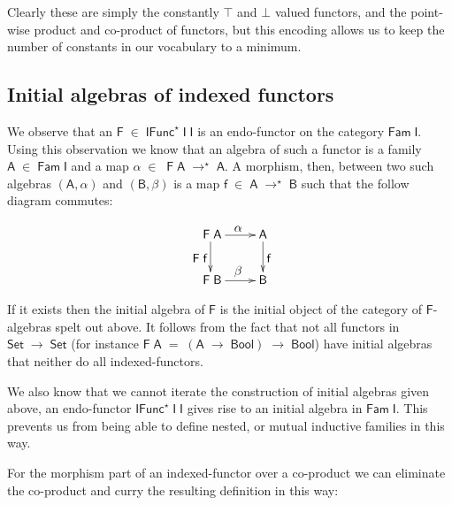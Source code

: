 \documentclass[a4paper]{article}
\newcommand{\Conid}[1]{\mathit{#1}}
\newcommand{\Varid}[1]{\mathit{#1}}
\renewcommand\Varid[1]{\mathord{\textsf{#1}}}
\let\Conid\Varid
\begin{document}
\noindent
Clearly these are simply the constantly \ensuremath{\top} and \ensuremath{\bot} valued functors, and the 
point-wise product and co-product of functors, but this encoding allows us to 
keep the number of constants in our vocabulary to a minimum.

\subsection{Initial algebras of indexed functors}

We observe that an \ensuremath{\Conid{F}\;\in\;\Conid{IFunc}^{\star}\;\Conid{I}\;\Conid{I}} is an endo-functor on the category \ensuremath{\Conid{Fam}\;\Conid{I}}. 
Using this observation we know that an algebra of such a functor is a family 
\ensuremath{\Conid{A}\;\in\;\Conid{Fam}\;\Conid{I}} and a map \ensuremath{\alpha\;\in\;\;\Conid{F}\;\Conid{A}\;\rightarrow^{\star}\;\Conid{A}}. A morphism, then, between two such 
algebras \ensuremath{(\Conid{A},\alpha)} and \ensuremath{(\Conid{B},\beta)} is a map \ensuremath{\Varid{f}\;\in\;\Conid{A}\;\rightarrow^{\star}\;\Conid{B}} such that the follow 
diagram commutes:

 \[
\xymatrix{
\mbox{\ensuremath{\;\Conid{F}\;\Conid{A}}}  \ar[r]^{\;\mbox{\ensuremath{\alpha}}} 
\ar[d]_{\mbox{\ensuremath{\;\Conid{F}\;\Varid{f}}}} & \mbox{\ensuremath{\Conid{A}}} \ar[d]^{\mbox{\ensuremath{\Varid{f}}}}\\
\mbox{\ensuremath{\;\Conid{F}\;\Conid{B}}} \ar[r]^{\;\mbox{\ensuremath{\beta}}} & \mbox{\ensuremath{\Conid{B}}}}
\]

\noindent
If it exists then the initial algebra of \ensuremath{\Conid{F}} is the initial object of the 
category of \ensuremath{\Conid{F}}-algebras spelt out above. It follows from the fact that not all
functors in \ensuremath{\Conid{Set}\;\rightarrow\;\Conid{Set}} (for instance \ensuremath{\Conid{F}\;\Conid{A}\;\mathrel{=}\;(\Conid{A}\;\rightarrow\;\Conid{Bool})\;\rightarrow\;\Conid{Bool}}) have initial 
algebras that neither do all indexed-functors.

We also know that we cannot iterate the construction of initial algebras given 
above, an endo-functor \ensuremath{\Conid{IFunc}^{\star}\;\Conid{I}\;\Conid{I}} gives rise to an initial algebra in \ensuremath{\Conid{Fam}\;\Conid{I}}.
This prevents us from being able to define nested, or mutual inductive families 
in this way.

For the morphism part of an indexed-functor over a co-product we can eliminate
the co-product and curry the resulting definition in this way:
\end{document}
